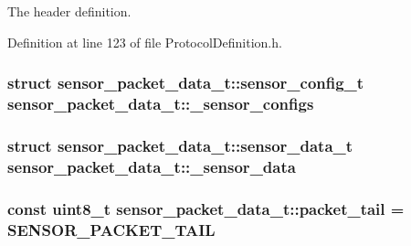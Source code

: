 \-The header definition. 



\-Definition at line 123 of file \-Protocol\-Definition.\-h.

\hypertarget{structsensor__packet__data__t_a4b9984cdc2dd55735ea9167e9688c4ac}{
\subsubsection[{\-\_\-sensor\-\_\-configs}]{\setlength{\rightskip}{0pt plus 5cm}struct {\bf sensor\-\_\-packet\-\_\-data\-\_\-t\-::sensor\-\_\-config\-\_\-t}  {\bf sensor\-\_\-packet\-\_\-data\-\_\-t\-::\-\_\-sensor\-\_\-configs}}}\label{structsensor__packet__data__t_a4b9984cdc2dd55735ea9167e9688c4ac}
\hypertarget{structsensor__packet__data__t_a61f1229c9a538d88a1f0cad5049643b6}{
\subsubsection[{\-\_\-sensor\-\_\-data}]{\setlength{\rightskip}{0pt plus 5cm}struct {\bf sensor\-\_\-packet\-\_\-data\-\_\-t\-::sensor\-\_\-data\-\_\-t} {\bf sensor\-\_\-packet\-\_\-data\-\_\-t\-::\-\_\-sensor\-\_\-data}}}\label{structsensor__packet__data__t_a61f1229c9a538d88a1f0cad5049643b6}
\hypertarget{structsensor__packet__data__t_a593d9687db7d4de5d3d2e514d171d33f}{
\subsubsection[{packet\-\_\-tail}]{\setlength{\rightskip}{0pt plus 5cm}const uint8\-\_\-t {\bf sensor\-\_\-packet\-\_\-data\-\_\-t\-::packet\-\_\-tail} = {\bf \-S\-E\-N\-S\-O\-R\-\_\-\-P\-A\-C\-K\-E\-T\-\_\-\-T\-A\-I\-L}}}\label{structsensor__packet__data__t_a593d9687db7d4de5d3d2e514d171d33f}


